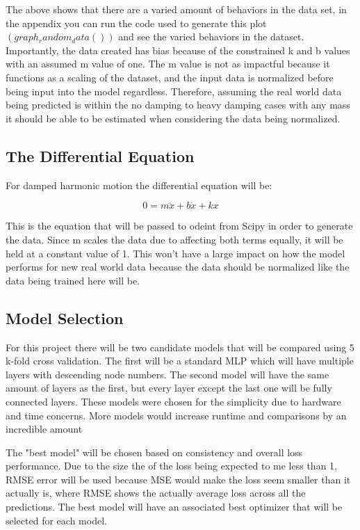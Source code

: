 \documentclass[12pt]{article}
\begin{document}
	The above shows that there are a varied amount of behaviors in the data set, in the appendix you can run the code used to generate this plot $(graph_random_data())$ and see the varied behaviors in the dataset. Importantly, the data created has bias because of the constrained k and b values with an assumed m value of one. The m value is not as impactful because it functions as a scaling of the dataset, and the input data is normalized before being input into the model regardless. Therefore, assuming the real world data being predicted is within the no damping to heavy damping cases with any mass it should be able to be estimated when considering the data being normalized.

	\subsection*{The Differential Equation}

	For damped harmonic motion the differential equation will be:

	$$ 0 = m\ddot{x}+ b\dot{x} + kx$$

	This is the equation that will be passed to odeint from Scipy in order to generate the data. Since m scales the data due to affecting both terms equally, it will be held at a constant value of 1. This won't have a large impact on how the model performs for new real world data because the data should be normalized like the data being trained here will be.

	\subsection*{Model Selection}

	For this project there will be two candidate models that will be compared using 5 k-fold cross validation. The first will be a standard MLP which will have multiple layers with descending node numbers. The second model will have the same amount of layers as the first, but every layer except the last one will be fully connected layers. These models were chosen for the simplicity due to hardware and time concerns. More models would increase runtime and comparisons by an incredible amount

	The "best model" will be chosen based on consistency and overall loss performance. Due to the size the of the loss being expected to me less than 1, RMSE error will be used because MSE would make the loss seem smaller than it actually is, where RMSE shows the actually average loss across all the predictions. The best model will have an associated best optimizer that will be selected for each model.
\end{document}
